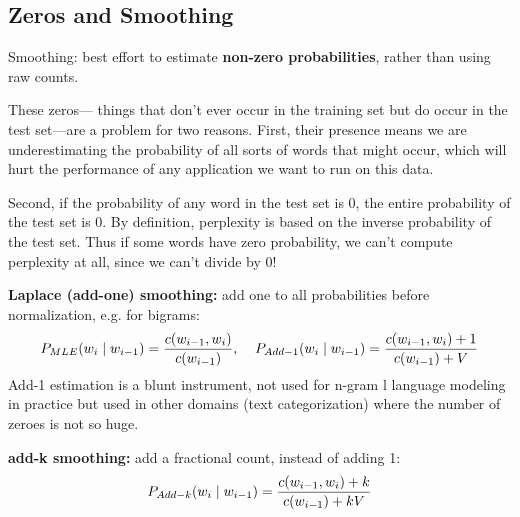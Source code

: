 \documentclass[12pt]{article}
\begin{document}
\subsection{Zeros and Smoothing}
\par Smoothing: best effort to estimate \textbf{non-zero probabilities}, rather than using raw counts.
\par These zeros— things that don’t ever occur in the training set but do occur in the test set—are a problem for two reasons. First, their presence means we are underestimating the probability of all sorts of words that might occur, which will hurt the performance of any application we want to run on this data.
\par Second, if the probability of any word in the test set is 0, the entire probability of the test set is 0. By definition, perplexity is based on the inverse probability of the test set. Thus if some words have zero probability, we can’t compute perplexity at all, since we can’t divide by 0!
\par \textbf{Laplace (add-one) smoothing:} add one to all probabilities before normalization, e.g. for bigrams:
\[ P_{MLE}(w_i\mid w_{i-1}) = \frac{c(w_{i-1},w_i)}{c(w_{i-1})} ,\;\;\;\; P_{Add-1}(w_i\mid w_{i-1}) = \frac{c(w_{i-1},w_i) + 1}{c(w_{i-1}) + V} \]
Add-1 estimation is a blunt instrument, not used for n-gram l language modeling in practice but used in other domains (text categorization) where the number of zeroes is not so huge.
\par \textbf{add-k smoothing:} add a fractional count, instead of adding 1:
\[ P_{Add-k}(w_i\mid w_{i-1}) = \frac{c(w_{i-1},w_i) + k}{c(w_{i-1}) + kV} \]
\end{document}
